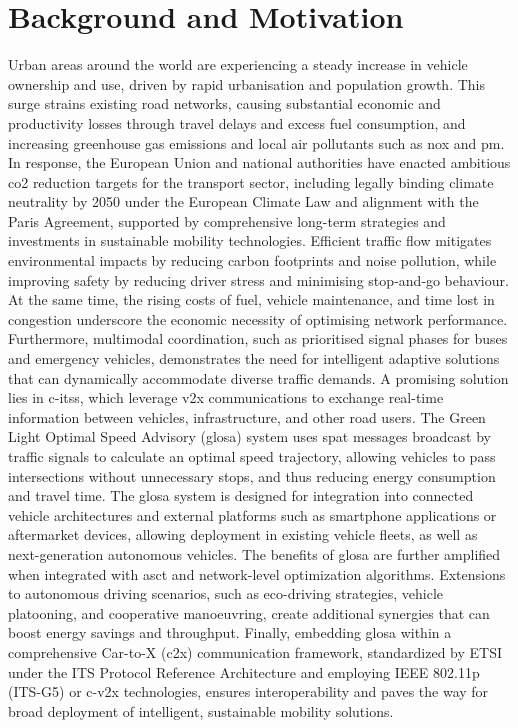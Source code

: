 \section{Background and Motivation}
\label{sec:Background_and_Motivation}

Urban areas around the world are experiencing a steady increase in vehicle ownership and use, driven by rapid urbanisation and population growth. This surge strains existing road networks, causing substantial economic and productivity losses through travel delays and excess fuel consumption, and increasing greenhouse gas emissions and local air pollutants such as \ac{nox} and \ac{pm}. In response, the European Union and national authorities have enacted ambitious \ac{co2} reduction targets for the transport sector, including legally binding climate neutrality by 2050 under the European Climate Law and alignment with the Paris Agreement, supported by comprehensive long-term strategies and investments in sustainable mobility technologies. \cite{eclts2050}
\mynewline
Efficient traffic flow mitigates environmental impacts by reducing carbon footprints and noise pollution, while improving safety by reducing driver stress and minimising stop‐and‐go behaviour. At the same time, the rising costs of fuel, vehicle maintenance, and time lost in congestion underscore the economic necessity of optimising network performance. Furthermore, multimodal coordination, such as prioritised signal phases for buses and emergency vehicles, demonstrates the need for intelligent adaptive solutions that can dynamically accommodate diverse traffic demands. 
\mynewline
A promising solution lies in \acp{c-its}, which leverage \ac{v2x} communications to exchange real-time information between vehicles, infrastructure, and other road users. The Green Light Optimal Speed Advisory (\ac{glosa}) system uses \ac{spat} messages broadcast by traffic signals to calculate an optimal speed trajectory, allowing vehicles to pass intersections without unnecessary stops, and thus reducing energy consumption and travel time. \cite{COPPOLA2022103455} The \ac{glosa} system is designed for integration into connected vehicle architectures and external platforms such as smartphone applications or aftermarket devices, allowing deployment in existing vehicle fleets, as well as next-generation autonomous vehicles. 
\mynewline
The benefits of \ac{glosa} are further amplified when integrated with \ac{asct} and network-level optimization algorithms. Extensions to autonomous driving scenarios, such as eco-driving strategies, vehicle platooning, and cooperative manoeuvring, create additional synergies that can boost energy savings and throughput. Finally, embedding \ac{glosa} within a comprehensive Car-to-X (\ac{c2x}) communication framework, standardized by ETSI under the ITS Protocol Reference Architecture and employing IEEE 802.11p (ITS-G5) or \ac{c-v2x} technologies, ensures interoperability and paves the way for broad deployment of intelligent, sustainable mobility solutions. \cite{etsi_tr_102638_v2_1_1}

